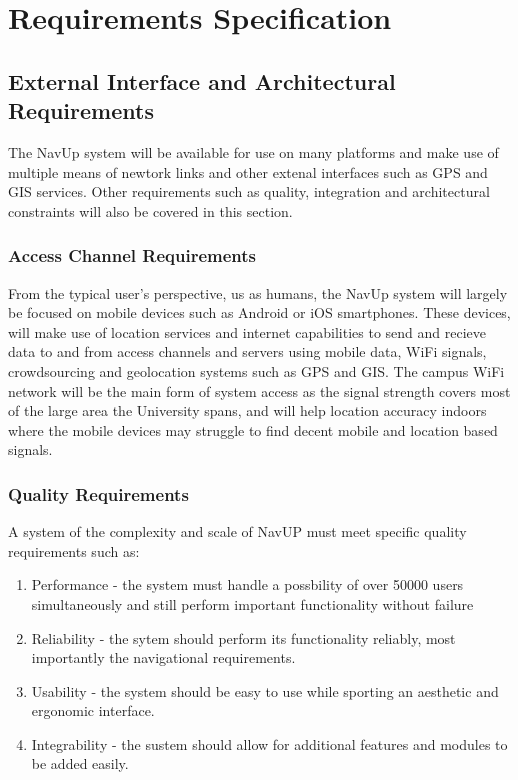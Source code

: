 \documentclass[12pt,a4paper]{report}
\begin{document}
\newpage
\section*{Requirements Specification}

	\subsection*{External Interface and Architectural Requirements}
		
		The NavUp system will be available for use on many platforms and make use of multiple means of newtork links and other extenal interfaces such as GPS and GIS services.
		Other requirements such as quality, integration and architectural constraints will also be covered in this section.
		
			\subsubsection*{Access Channel Requirements}
				From the typical user's perspective, us as humans, the NavUp system will largely be focused on mobile devices such as Android or iOS smartphones.
				These devices, will make use of location services and internet capabilities to send and recieve data to and from access channels and servers using mobile data,
				WiFi signals, crowdsourcing and geolocation systems such as GPS and GIS. The campus WiFi network will be the main form of system access as the signal
				strength covers most of the large area the University spans, and will help location accuracy indoors where the mobile devices may struggle to find decent mobile
				and location based signals.
				
			\subsubsection*{Quality Requirements}
				A system of the complexity and scale of NavUP must meet specific quality requirements such as:
				
				\begin{enumerate}
				\renewcommand{\labelenumi}{{\textbf{\arabic{enumi}.}}}
				\item Performance - the system must handle a possbility of over 50000 users simultaneously and still perform important functionality without failure
				\item Reliability - the sytem should perform its functionality reliably, most importantly the navigational requirements.
				\item Usability - the system should be easy to use while sporting an aesthetic and ergonomic interface.
				\item Integrability - the sustem should allow for additional features and modules to be added easily.
				\end{enumerate}
				
\end{document}
